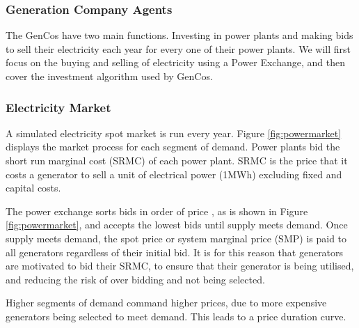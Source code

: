 \subsubsection{Generation Company Agents} The GenCos have two main functions. Investing in power plants and making bids to sell their electricity each year for every one of their power plants. We will first focus on the buying and selling of electricity using a Power Exchange, and then cover the investment algorithm used by GenCos.

\subsubsection{Electricity Market} \label{sssec:electricity_market} A simulated electricity spot market is run every year. {\color{red}Figure \ref{fig:powermarket} displays the market process for each segment of demand.} Power plants bid the short run marginal cost (SRMC) of each power plant. SRMC is the price that it costs a generator to sell a unit of electrical power (1MWh) excluding fixed and capital costs. 

The power exchange sorts bids in order of price {\color{red}, as is shown in Figure \ref{fig:powermarket}}, and accepts the lowest bids until supply meets demand. Once supply meets demand, the spot price or system marginal price (SMP) is paid to all generators regardless of their initial bid. It is for this reason that generators are motivated to bid their SRMC, to ensure that their generator is being utilised, and reducing the risk of over bidding and not being selected.

{\color{red}Higher segments of demand command higher prices, due to more expensive generators being selected to meet demand. This leads to a price duration curve.
} 

